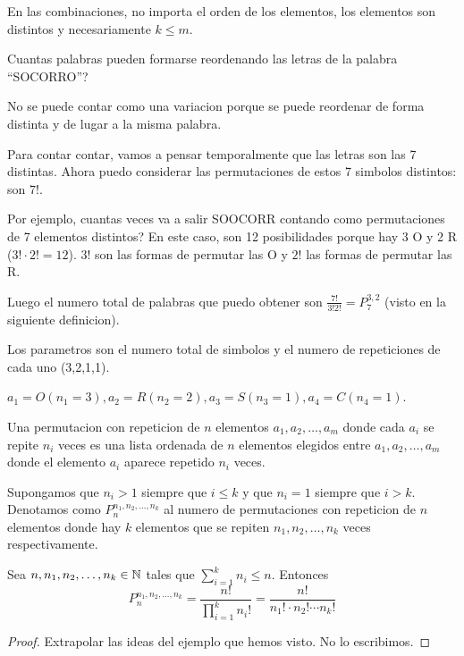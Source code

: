 En las combinaciones, no importa el orden de los elementos, los elementos son distintos y necesariamente \(k \leq m \).

\begin{example}
	Cuantas palabras pueden formarse reordenando las letras de la palabra ``SOCORRO''?
	
	No se puede contar como una variacion porque se puede reordenar de forma distinta y de lugar a la misma palabra.
	
	Para contar contar, vamos a pensar temporalmente que las letras son las 7 distintas. Ahora puedo considerar las permutaciones de estos 7 simbolos distintos: son \(7! \).
	
	Por ejemplo, cuantas veces va a salir SOOCORR contando como permutaciones de 7 elementos distintos? En este caso, son 12 posibilidades porque hay 3 O y 2 R (\(3! \cdot 2! = 12\)). \(3! \) son las formas de permutar las O y \(2! \) las formas de permutar las R.
	
	Luego el numero total de palabras que puedo obtener son \(\frac{7! }{3!2!} = P^{3,2}_7 \) (visto en la siguiente definicion).
	
	Los parametros son el numero total de simbolos y el numero de repeticiones de cada uno (3,2,1,1).
	
	\(a_1 = O (n_1 = 3), a_2 = R (n_2 = 2), a_3 = S (n_3 = 1), a_4 = C (n_4 = 1)\).
\end{example}

\begin{definition}
	Una permutacion con repeticion de \(n \) elementos \(a_1,a_2, \ldots, a_m \) donde cada \(a_i \) se repite \(n_i \) veces es una lista ordenada de \(n \) elementos elegidos entre \(a_1,a_2,\ldots,a_m \) donde el elemento \(a_i \) aparece repetido \(n_i \) veces.
	
	Supongamos que \(n_i > 1 \) siempre que \(i \leq k \) y que \(n_i = 1 \) siempre que \(i > k \). Denotamos como \(P^{n_1,n_2,\ldots,n_k}_n \) al numero de permutaciones con repeticion de \(n \) elementos donde hay \(k \) elementos que se repiten \(n_1,n_2, \ldots, n_k \) veces respectivamente.
\end{definition}
\begin{theorem}
	Sea \(n,n_1,n_2,\ldots,n_k \in \mathbb{N} \) tales que \(\sum_{i=1}^{k} n_i \leq n \). Entonces
	\[
		P^{n_1,n_2,\ldots,n_k}_{n} = \frac{n! }{\prod_{i =1}^{k} n_i !} = \frac{n! }{n_1! \cdot n_2! \cdots n_k!}
	\]
\end{theorem}
\begin{proof}
	Extrapolar las ideas del ejemplo que hemos visto. No lo escribimos.
\end{proof}

